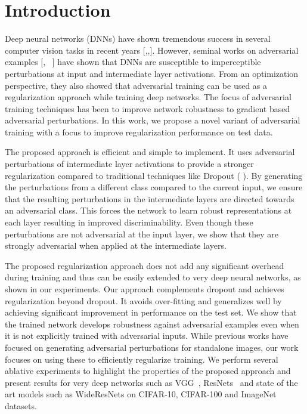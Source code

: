 \documentclass[letterpaper]{article} %
\begin{document}
\section{Introduction}\label{sec:intro}
Deep neural networks (DNNs) have shown tremendous success in several computer vision tasks in recent years [\cite{resnet},\cite{schroff2015facenet},\cite{krizhevsky2012imagenet}]. However, seminal works on adversarial examples [\cite{goodfellow2014explaining}, ~\cite{szegedy2013intriguing}] have shown that DNNs are susceptible to imperceptible perturbations at input and intermediate layer activations. From an optimization perspective, they also showed that adversarial training can be used as a regularization approach while training deep networks.  The focus of adversarial training techniques has been to improve network robustness to gradient based adversarial perturbations. In this work, we propose a novel variant of adversarial training with a focus to improve regularization performance on test data.

The proposed approach is efficient and simple to implement. It uses adversarial perturbations of intermediate layer activations to provide a stronger regularization compared to traditional techniques like Dropout (\citeauthor{srivastava2014dropout} \citeyear{srivastava2014dropout}). By generating the perturbations from a different class compared to the current input, we ensure that the resulting perturbations in the intermediate layers are directed towards an adversarial class. This forces the network to learn robust representations at each layer resulting in improved discriminability. Even though these perturbations are not adversarial at the input layer, we show that they are strongly adversarial when applied at the intermediate layers.

The proposed regularization approach does not add any significant overhead during training and thus can be easily extended to very deep neural networks, as shown in our experiments. Our approach complements dropout and achieves regularization beyond dropout. It avoids over-fitting and generalizes well by achieving significant improvement in performance on the test set. We show that the trained network develops robustness against adversarial examples even when it is not explicitly trained with adversarial inputs. While previous works have focused on generating adversarial perturbations for standalone images, our work focuses on using these to efficiently regularize training. We perform several ablative experiments to highlight the properties of the proposed approach and present results for very deep networks such as VGG~\cite{vgg}, ResNets~\cite{resnet} and state of the art models such as WideResNets \cite{wideresnet} on CIFAR-10, CIFAR-100 and ImageNet datasets.
\end{document}
